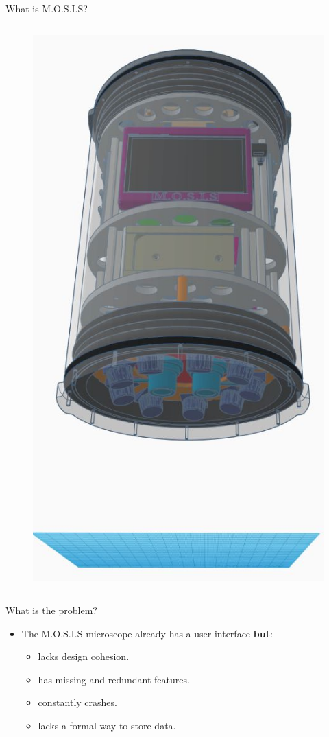 \documentclass[17pt, aspectratio=169]{beamer}
\begin{document}
\begin{frame}{What is M.O.S.I.S?}
\begin{columns}
		\centering
		\begin{figure}
			\includegraphics[height=0.85\textheight]{./Figures/M.O.S.I.S_Model.jpeg}
		\end{figure}
	\end{columns}
\end{frame}
\begin{frame}{What is the problem?}
	\begin{itemize}
		\item The M.O.S.I.S microscope already has a user interface \textbf{but}:
		      \begin{itemize}
			      \item lacks design cohesion.
			      \item has missing and redundant features.
			      \item constantly crashes.
			      \item lacks a formal way to store data.
		      \end{itemize}
	\end{itemize}
\end{frame}
\end{document}
